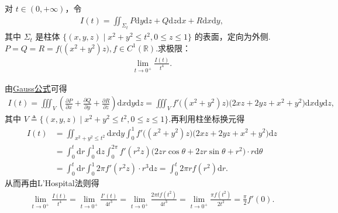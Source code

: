 \documentclass[../../main.tex]{subfiles}%
\begin{document}
\begin{example}
对 $t\in(0,+\infty)$，令
\begin{align*}
I(t)=\iint_{\Sigma_t} P\mathrm{d}y\mathrm{d}z+Q\mathrm{d}z\mathrm{d}x+R\mathrm{d}x\mathrm{d}y,
\end{align*}
其中 $\Sigma_t$ 是柱体 $\{(x,y,z)\mid x^2+y^2\leqslant t^2,0\leqslant z\leqslant 1\}$ 的表面，定向为外侧.$P = Q = R = f\big((x^2+y^2)z\big), f \in C^1(\mathbb{R})$.求极限：
\begin{align*}
\lim\limits_{t\to0^+}\frac{I(t)}{t^4}.
\end{align*}
\end{example}
\begin{solution}

由\hyperref[theorem:Gauss公式--数分]{Gauss公式}可得
\begin{align*}
I(t)=\iiint_V \left(\frac{\partial P}{\partial x}+\frac{\partial Q}{\partial y}+\frac{\partial R}{\partial z}\right)\mathrm{d}x\mathrm{d}y\mathrm{d}z=\iiint_V f'\big((x^2+y^2)z\big)\big(2xz+2yz+x^2+y^2\big)\mathrm{d}x\mathrm{d}y\mathrm{d}z,
\end{align*}
其中 $V\triangleq\{(x,y,z)\mid x^2+y^2\leqslant t^2,0\leqslant z\leqslant1\}$.再利用柱坐标换元得
\begin{align*}
I(t)&=\iint_{x^2+y^2\leqslant t^2}\mathrm{d}x\mathrm{d}y\int_0^1 f'\big((x^2+y^2)z\big)\big(2xz+2yz+x^2+y^2\big)\mathrm{d}z\\
&=\int_0^t \mathrm{d}r\int_0^1 \mathrm{d}z\int_0^{2\pi} f'(r^2z)\big(2zr\cos\theta+2zr\sin\theta+r^2\big)\cdot r\mathrm{d}\theta\\
&=\int_0^t \mathrm{d}r\int_0^1 2\pi f'(r^2z)\cdot r^3\mathrm{d}z
=\int_0^t 2\pi r f(r^2)\mathrm{d}r.
\end{align*}
从而再由L'Hospital法则得
\begin{align*}
\lim_{t\to0^+}\frac{I(t)}{t^4}=\lim_{t\to0^+}\frac{I'(t)}{4t^3}=\lim_{t\to0^+}\frac{2\pi t f(t^2)}{4t^3}=\lim_{t\to0^+}\frac{\pi f(t^2)}{2t^2}=\frac{\pi}{2}f'(0).
\end{align*}
\end{solution}
\end{document}
